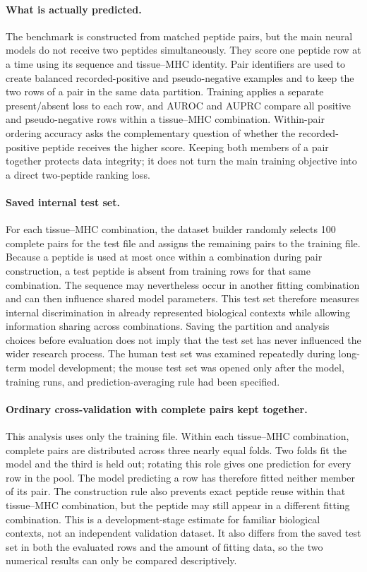 \paragraph{What is actually predicted.}
The benchmark is constructed from matched peptide pairs, but the main neural models do not receive two peptides simultaneously. They score one peptide row at a time using its sequence and tissue--MHC identity. Pair identifiers are used to create balanced recorded-positive and pseudo-negative examples and to keep the two rows of a pair in the same data partition. Training applies a separate present/absent loss to each row, and AUROC and AUPRC compare all positive and pseudo-negative rows within a tissue--MHC combination. Within-pair ordering accuracy asks the complementary question of whether the recorded-positive peptide receives the higher score. Keeping both members of a pair together protects data integrity; it does not turn the main training objective into a direct two-peptide ranking loss.

\paragraph{Saved internal test set.}
For each tissue--MHC combination, the dataset builder randomly selects 100 complete pairs for the test file and assigns the remaining pairs to the training file. Because a peptide is used at most once within a combination during pair construction, a test peptide is absent from training rows for that same combination. The sequence may nevertheless occur in another fitting combination and can then influence shared model parameters. This test set therefore measures internal discrimination in already represented biological contexts while allowing information sharing across combinations. Saving the partition and analysis choices before evaluation does not imply that the test set has never influenced the wider research process. The human test set was examined repeatedly during long-term model development; the mouse test set was opened only after the model, training runs, and prediction-averaging rule had been specified.

\paragraph{Ordinary cross-validation with complete pairs kept together.}
This analysis uses only the training file. Within each tissue--MHC combination, complete pairs are distributed across three nearly equal folds. Two folds fit the model and the third is held out; rotating this role gives one prediction for every row in the pool. The model predicting a row has therefore fitted neither member of its pair. The construction rule also prevents exact peptide reuse within that tissue--MHC combination, but the peptide may still appear in a different fitting combination. This is a development-stage estimate for familiar biological contexts, not an independent validation dataset. It also differs from the saved test set in both the evaluated rows and the amount of fitting data, so the two numerical results can only be compared descriptively.

